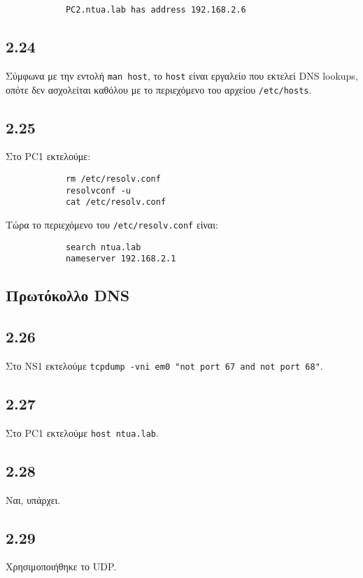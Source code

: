 \documentclass[a4paper, 12pt]{article}
\begin{document}
		\begin{verbatim}
			PC2.ntua.lab has address 192.168.2.6
		\end{verbatim}

	\subsection*{2.24}
		Σύμφωνα με την εντολή \verb|man host|, το \verb|host| είναι εργαλείο που εκτελεί DNS lookups, οπότε δεν ασχολείται καθόλου με το περιεχόμενο του αρχείου \verb|/etc/hosts|.

	\subsection*{2.25}
		Στο PC1 εκτελούμε:
		
		\begin{verbatim}
			rm /etc/resolv.conf
			resolvconf -u
			cat /etc/resolv.conf
		\end{verbatim}
		
		Τώρα το περιεχόμενο του \verb|/etc/resolv.conf| είναι:
		
		\begin{verbatim}
			search ntua.lab
			nameserver 192.168.2.1
		\end{verbatim}

	\subsection*{Πρωτόκολλο DNS}

	\subsection*{2.26}
		Στο NS1 εκτελούμε \verb|tcpdump -vni em0 "not port 67 and not port 68"|.

	\subsection*{2.27}
		Στο PC1 εκτελούμε \verb|host ntua.lab|.

	\subsection*{2.28}
		Ναι, υπάρχει.

	\subsection*{2.29}
		Χρησιμοποιήθηκε το UDP.
\end{document}

